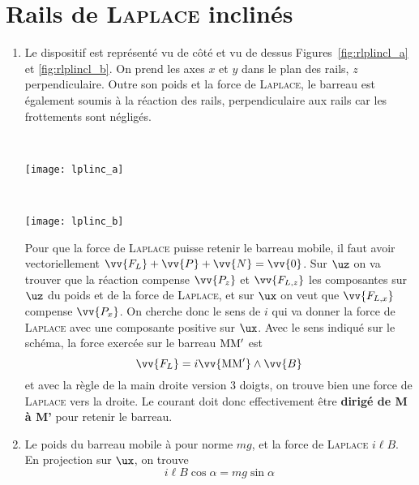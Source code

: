 \documentclass[a4paper, 11pt, final, garamond]{book}
\begin{document}
\section{Rails de \textsc{Laplace} inclinés}
\label{sec:railpl}
\begin{enumerate}
  \item Le dispositif est représenté vu de côté et vu de dessus
    Figures~\ref{fig:rlplincl_a} et \ref{fig:rlplincl_b}. On prend les axes
    $x$ et $y$ dans le plan des rails, $z$ perpendiculaire. Outre son poids et
    la force de \textsc{Laplace}, le barreau est également soumis à la réaction
    des rails, perpendiculaire aux rails car les frottements sont négligés.
    \smallbreak
    \noindent
    \begin{minipage}[c]{.45\linewidth}
      ~
      \begin{center}
        \texttt{[image: lplinc\_a]}
        \label{fig:rlplincl_a}
      \end{center}
    \end{minipage}
    \hfill
    \begin{minipage}[c]{.45\linewidth}
      ~
      \begin{center}
        \texttt{[image: lplinc\_b]}
        \label{fig:rlplincl_b}
      \end{center}
    \end{minipage}
    \smallbreak
    Pour que la force de \textsc{Laplace} puisse retenir le barreau mobile, il
    faut avoir vectoriellement $\vv{F_L} + \vv{P} + \vv{N} = \vv{0}$. Sur $\uz$
    on va trouver que la réaction compense $\vv{P_z}$ et $\vv{F_{L,z}}$ les
    composantes sur $\uz$ du poids et de la force de \textsc{Laplace}, et sur
    $\ux$ on veut que $\vv{F_{L,x}}$ compense $\vv{P_x}$.
    \smallbreak
    On cherche donc le sens de $i$ qui va donner la force de \textsc{Laplace}
    avec une composante positive sur $\ux$. Avec le sens indiqué sur le schéma,
    la force exercée sur le barreau $\rm MM'$ est
    \[
      \vv{F_L} = i \vv{\rm MM'} \wedge \vv{B}
    \]
    et avec la règle de la main droite version 3 doigts, on trouve bien une
    force de \textsc{Laplace} vers la droite. Le courant doit donc effectivement
    être \textbf{dirigé de M à M'} pour retenir le barreau.
  \item Le poids du barreau mobile à pour norme $mg$, et la force de
    \textsc{Laplace} $i \ell B$. En projection sur $\ux$, on trouve
    \[
      i \ell B \cos{\alpha} = mg \sin{\alpha}
\]
\end{enumerate}
\end{document}
